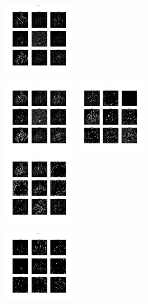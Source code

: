 \documentclass{article}
\begin{document}
{{\begin{figure}[htp]
\begin{overprint}
                \includegraphics[width=0.33\textwidth]{Assignment-12/fig-5.jpg}
            \end{overprint}
            \begin{overprint}
                \includegraphics[width=0.33\textwidth]{Assignment-12/fig-6.jpg}
                \includegraphics[width=0.33\textwidth]{Assignment-12/fig-7.jpg}
                \includegraphics[width=0.33\textwidth]{Assignment-12/fig-8.jpg}
            \end{overprint}
            \begin{overprint}
                \includegraphics[width=0.33\textwidth]{Assignment-12/fig-9.jpg}

\end{overprint}
\end{figure}}}
\end{document}
